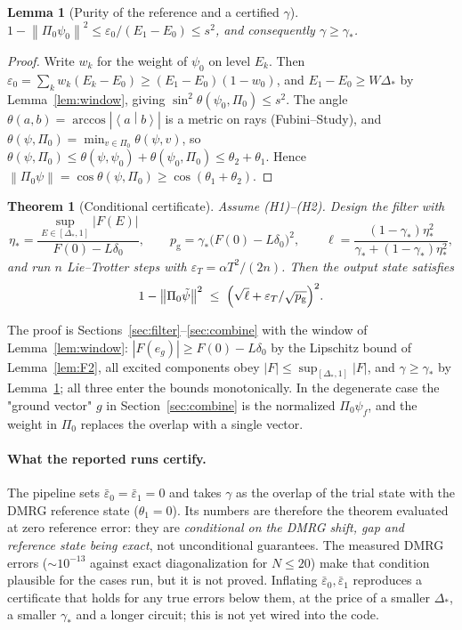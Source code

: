 \documentclass[11pt]{article}
\newtheorem{lemma}{Lemma}
\newtheorem{theorem}{Theorem}
\theoremstyle{definition}
\newcommand{\norm}[1]{\left\lVert #1\right\rVert}
\newcommand{\abs}[1]{\left\lvert #1\right\rvert}
\newcommand{\braket}[2]{\left\langle #1 \middle| #2\right\rangle}
\newcommand{\eps}{\varepsilon}
\newcommand{\pg}{p_{\mathrm g}}
\begin{document}
\begin{lemma}[Purity of the reference and a certified $\gamma$]\label{lem:purity}
$1-\norm{\Pi_0\psi_0}^2\le\varepsilon_0/(E_1-E_0)\le s^2$, and consequently $\gamma\ge\gamma_*$.
\end{lemma}
\begin{proof}
Write $w_k$ for the weight of $\psi_0$ on level $E_k$. Then $\varepsilon_0=\sum_kw_k(E_k-E_0)\ge(E_1-E_0)(1-w_0)$, and
$E_1-E_0\ge W\Delta_*$ by Lemma~\ref{lem:window}, giving $\sin^2\theta(\psi_0,\Pi_0)\le s^2$. The angle $\theta(a,b)=\arccos\abs{\braket ab}$ is a metric
on rays (Fubini--Study), and $\theta(\psi,\Pi_0)=\min_{v\in\Pi_0}\theta(\psi,v)$, so
$\theta(\psi,\Pi_0)\le\theta(\psi,\psi_0)+\theta(\psi_0,\Pi_0)\le\theta_2+\theta_1$. Hence $\norm{\Pi_0\psi}=\cos\theta(\psi,\Pi_0)\ge\cos(\theta_1+\theta_2)$.
\end{proof}

\begin{theorem}[Conditional certificate]\label{thm:main}
Assume (H1)--(H2). Design the filter with
\[
  \eta_*=\frac{\sup_{E\in[\Delta_*,1]}\abs{F(E)}}{F(0)-L\delta_0},\qquad \pg=\gamma_*\bigl(F(0)-L\delta_0\bigr)^2,\qquad
  \ell=\frac{(1-\gamma_*)\eta_*^2}{\gamma_*+(1-\gamma_*)\eta_*^2},
\]
and run $n$ Lie--Trotter steps with $\eps_T=\alpha T^2/(2n)$. Then the output state satisfies
\[
  1-\norm{\Pi_0\tilde\psi}^2\;\le\;\Bigl(\sqrt\ell+\eps_T/\sqrt{\pg}\Bigr)^2 .
\]
\end{theorem}
The proof is Sections~\ref{sec:filter}--\ref{sec:combine} with the window of Lemma~\ref{lem:window}: $\abs{F(e_g)}\ge F(0)-L\delta_0$ by the Lipschitz
bound of Lemma~\ref{lem:F2}, all excited components obey $\abs F\le\sup_{[\Delta_*,1]}\abs F$, and $\gamma\ge\gamma_*$ by Lemma~\ref{lem:purity};
all three enter the bounds monotonically. In the degenerate case the "ground vector" $g$ in Section~\ref{sec:combine} is the normalized
$\Pi_0\psi_f$, and the weight in $\Pi_0$ replaces the overlap with a single vector.

\paragraph{What the reported runs certify.} The pipeline sets $\bar\varepsilon_0=\bar\varepsilon_1=0$ and takes $\gamma$ as the overlap of the trial state with the
DMRG reference state ($\theta_1=0$). Its numbers are therefore the theorem evaluated at zero reference error: they are
\emph{conditional on the DMRG shift, gap and reference state being exact}, not unconditional guarantees. The measured DMRG errors
($\sim10^{-13}$ against exact diagonalization for $N\le20$) make that condition plausible for the cases run, but it is not proved.
Inflating $\bar\varepsilon_0,\bar\varepsilon_1$ reproduces a certificate that holds for any true errors below them, at the price of a
smaller $\Delta_*$, a smaller $\gamma_*$ and a longer circuit; this is not yet wired into the code.
\end{document}
